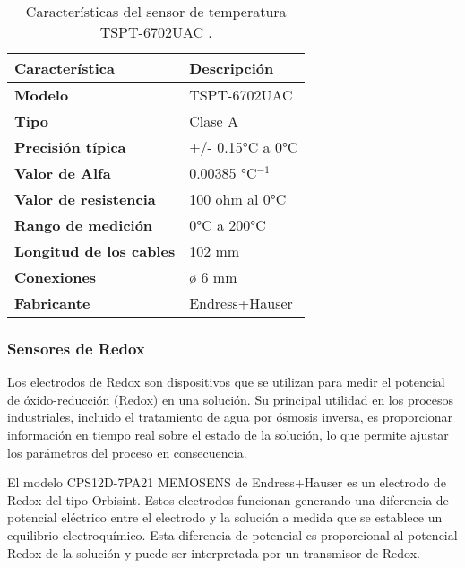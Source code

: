 \begin{table}[H]
    \centering
    \caption{Características del sensor de temperatura TSPT-6702UAC .}
    \label{table:sensor_temperatura}
    \begin{tabular}{| L{6cm} | L{6cm} |}
        \hline
        \textbf{Característica}         & \textbf{Descripción} \\
        \hline
        \textbf{Modelo}                 & TSPT-6702UAC         \\
        \hline
        \textbf{Tipo}                   & Clase A              \\
        \hline
        \textbf{Precisión típica}       & +/- 0.15°C a 0°C     \\
        \hline
        \textbf{Valor de Alfa}          & 0.00385 °C$^{-1}$    \\
        \hline
        \textbf{Valor de resistencia}   & 100 ohm al 0°C       \\
        \hline
        \textbf{Rango de medición}      & 0°C a 200°C          \\
        \hline
        \textbf{Longitud de los cables} & 102 mm               \\
        \hline
        \textbf{Conexiones}             & ø 6 mm               \\
        \hline
        \textbf{Fabricante}             & Endress+Hauser       \\
        \hline
    \end{tabular}
\end{table}

\subsubsection{Sensores de Redox} \label{sec:sensor_redox}

Los electrodos de Redox son dispositivos que se utilizan para medir el potencial de óxido-reducción (Redox) en una
solución. Su principal utilidad en los procesos industriales, incluido el tratamiento de agua por ósmosis inversa,
es proporcionar información en tiempo real sobre el estado de la solución, lo que permite ajustar los parámetros
del proceso en consecuencia.

El modelo CPS12D-7PA21 MEMOSENS de Endress+Hauser es un electrodo de Redox del tipo Orbisint. Estos electrodos
funcionan generando una diferencia de potencial eléctrico entre el electrodo y la solución a medida que se establece
un equilibrio electroquímico. Esta diferencia de potencial es proporcional al potencial Redox de la solución y puede
ser interpretada por un transmisor de Redox.

